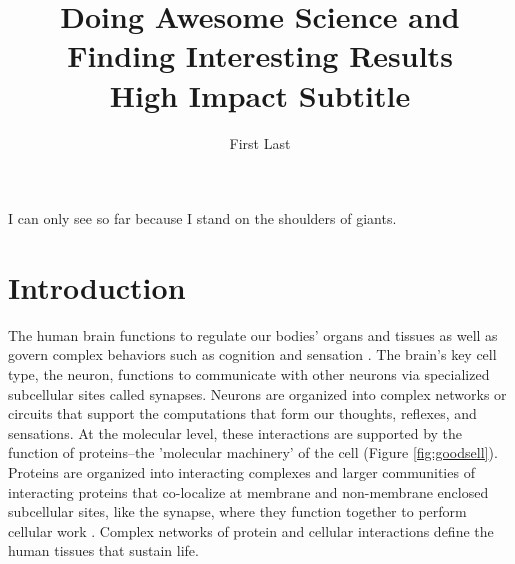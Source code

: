 \documentclass[PhD]{dukethesis}
\author{First Last}
\title{
		\large{Doing Awesome Science and Finding Interesting Results}\\
		\small{High Impact Subtitle}
	}
\begin{document}
\begin{singlespace}
\maketitle
\end{singlespace}


\Copyright




\abstract

\lipsum[1]



\acknowledgements

I can only see so far because I stand on the shoulders of giants.

\lipsum[2-3]



\begin{singlespace}
\tableofcontents

\listoffigures

\listoftables
\end{singlespace}





\chapter{Introduction}
\label{chap:01}

The human brain functions to regulate our bodies' organs and tissues as well as
govern complex behaviors such as cognition and sensation \cite{Kandel2012}. The
brain's key cell type, the neuron, functions to communicate with other neurons
via specialized subcellular sites called synapses. Neurons are organized into
complex networks or circuits that support the computations that form our
thoughts, reflexes, and sensations. At the molecular level, these interactions
are supported by the function of proteins--the 'molecular machinery' of the cell
(Figure \ref{fig:goodsell}).  Proteins are organized into interacting complexes
and larger communities of interacting proteins that co-localize at membrane and
non-membrane enclosed subcellular sites, like the synapse, where they function
together to perform cellular work \cite{Alberts2008}. Complex
networks of protein and cellular interactions define the human tissues that
sustain life. 
\end{document}
